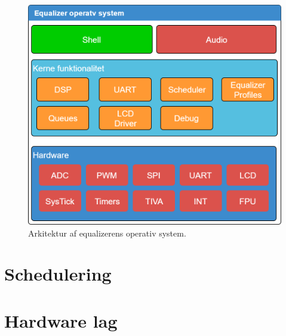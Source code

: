 \begin{figure}[h!]
	\centering
	\includegraphics[width=.8\textwidth]{billeder/eq_os.png}
	\caption{Arkitektur af equalizerens operativ system.}
	\label{fig:eq_os}
\end{figure}
\FloatBlock


\section{Schedulering}




\section{Hardware lag}



